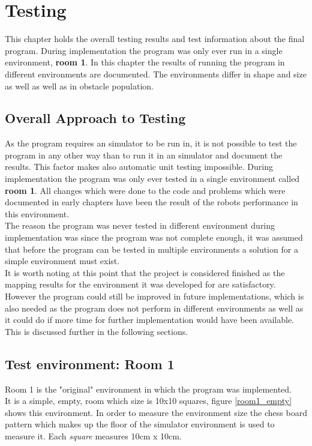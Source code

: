 \chapter{Testing}
\label{Testing}
This chapter holds the overall testing results and test information about the final program.
During implementation the program was only ever run in a single environment, \textbf{room 1}.
In this chapter the results of running the program in different environments are documented. The environments differ in shape and size as well as well as in obstacle population.

\section{Overall Approach to Testing}
As the program requires an simulator to be run in, it is not possible to test the program in any other way than to run it in an simulator and document the results. This factor makes also automatic unit testing impossible. During implementation the program was only ever tested in a single environment called \textbf{room 1}. All changes which were done to the code and problems which were documented in early chapters have been the result of the robots performance in this environment. \\[3ex]

The reason the program was never tested in different environment during implementation was since the program was not complete enough, it was assumed that before the program can be tested in multiple environments a solution for a simple environment must exist.\\
It is worth noting at this point that the project is considered finished as the mapping results for the environment it was developed for are satisfactory. However the program could still be improved in future implementations, which is also needed as the program does not perform in different environments as well as it could do if more time for further implementation would have been available. 
This is discussed further in the following sections.

\section{Test environment: Room 1}
\label{room1}
Room 1 is the "original" environment in which the program was implemented. \\
It is a simple, empty, room which size is 10x10 squares, figure \ref{room1_empty} shows this environment. In order to measure the environment size the chess board pattern which makes up the floor of the simulator environment is used to measure it. Each \textit{square} measures 10cm x 10cm.

